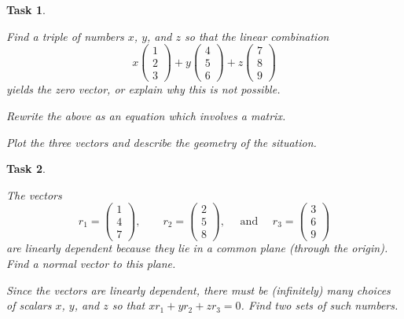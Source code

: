 \documentclass[10pt,]{book}
\theoremstyle{plain}
\numberwithin{equation}{section}
\newtheorem{task}{Task}[chapter]
\begin{document}
\begin{task}
\label{task-27}

          Find a triple of numbers \(x\), \(y\), and \(z\) so that the
          linear combination\[
            x \begin{pmatrix} 1 \\ 2 \\ 3 \end{pmatrix} +
            y \begin{pmatrix} 4 \\ 5\\ 6 \end{pmatrix} +
            z \begin{pmatrix} 7 \\ 8 \\ 9 \end{pmatrix}
          \]
          yields the zero vector, or explain why this is not possible.
\par

          Rewrite the above as an equation which involves a matrix.
\par

          Plot the three vectors and describe the geometry of the situation.
\end{task}
\begin{task}
\label{task-28}

          The vectors\[
            r_1 = \begin{pmatrix} 1 \\ 4 \\ 7 \end{pmatrix}, \qquad
            r_2 = \begin{pmatrix} 2 \\ 5 \\ 8 \end{pmatrix}, \quad \text{ and } \quad
            r_3 = \begin{pmatrix} 3 \\ 6 \\ 9 \end{pmatrix}
          \]
          are linearly dependent because they lie in a common plane (through
          the origin). Find a normal vector to this plane.
\par

          Since the vectors are linearly dependent, there must be (infinitely)
          many choices of scalars \(x\), \(y\), and \(z\) so that
          \(x r_1 + y r_2 + z r_3 = 0\). Find two sets of such numbers.
\end{task}
\end{document}
